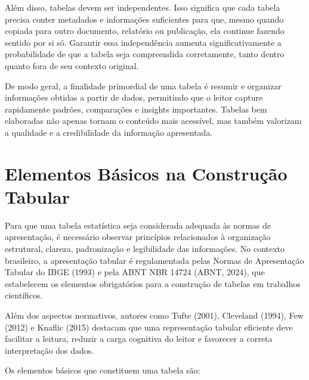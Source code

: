 Além disso, tabelas devem ser independentes. Isso significa que cada tabela precisa conter metadados e informações suficientes para que, mesmo quando copiada para outro documento, relatório ou publicação, ela continue fazendo sentido por si só. Garantir essa independência aumenta significativamente a probabilidade de que a tabela seja compreendida corretamente, tanto dentro quanto fora de seu contexto original.\vskip0.3cm

De modo geral, a finalidade primordial de uma tabela é resumir e organizar informações obtidas a partir de dados, permitindo que o leitor capture rapidamente padrões, comparações e insights importantes. Tabelas bem elaboradas não apenas tornam o conteúdo mais acessível, mas também valorizam a qualidade e a credibilidade da informação apresentada.




\section{Elementos Básicos na Construção Tabular}


Para que uma tabela estatística seja considerada adequada às normas de apresentação, é necessário observar princípios relacionados à organização estrutural, clareza, padronização e legibilidade das informações. No contexto brasileiro, a apresentação tabular é regulamentada pelas Normas de Apresentação Tabular do IBGE (1993) e pela ABNT NBR 14724 (ABNT, 2024), que estabelecem os elementos obrigatórios para a construção de tabelas em trabalhos científicos. \vskip0.3cm

Além dos aspectos normativos, autores como Tufte (2001), Cleveland (1994), Few (2012) e Knaflic (2015) destacam que uma representação tabular eficiente deve facilitar a leitura, reduzir a carga cognitiva do leitor e favorecer a correta interpretação dos dados. \vskip0.3cm

Os elementos básicos que constituem uma tabela são:


